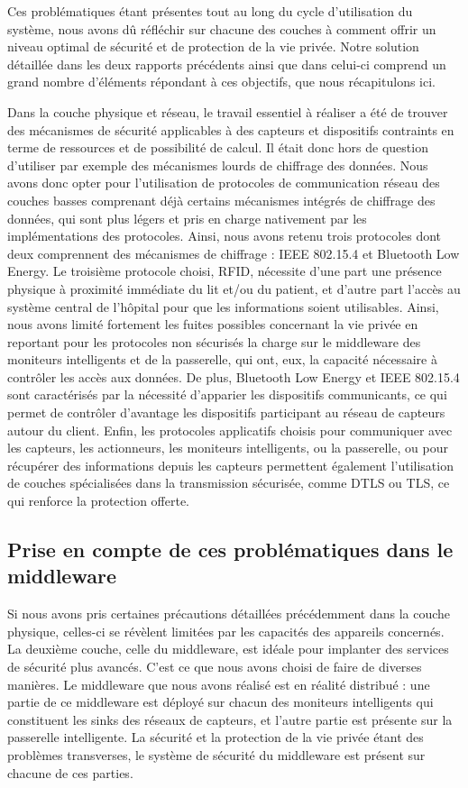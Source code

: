 Ces problématiques étant présentes tout au long du cycle d’utilisation du système, nous avons dû réfléchir sur chacune des couches à comment offrir un niveau optimal de sécurité et de protection de la vie privée. Notre solution détaillée dans les deux rapports précédents ainsi que dans celui-ci comprend un grand nombre d’éléments répondant à ces objectifs, que nous récapitulons ici.

Dans la couche physique et réseau, le travail essentiel à réaliser a été de trouver des mécanismes de sécurité applicables à des capteurs et dispositifs contraints en terme de ressources et de possibilité de calcul. Il était donc hors de question d’utiliser par exemple des mécanismes lourds de chiffrage des données. Nous avons donc opter pour l’utilisation de protocoles de communication réseau des couches basses comprenant déjà certains mécanismes intégrés de chiffrage des données, qui sont plus légers et pris en charge nativement par les implémentations des protocoles. Ainsi, nous avons retenu trois protocoles dont deux comprennent des mécanismes de chiffrage : IEEE 802.15.4 et Bluetooth Low Energy. Le troisième protocole choisi, RFID, nécessite d’une part une présence physique à proximité immédiate du lit et/ou du patient, et d’autre part l’accès au système central de l’hôpital pour que les informations soient utilisables. Ainsi, nous avons limité fortement les fuites possibles concernant la vie privée en reportant pour les protocoles non sécurisés la charge sur le middleware des moniteurs intelligents et de la passerelle, qui ont, eux, la capacité nécessaire à contrôler les accès aux données. De plus, Bluetooth Low Energy et IEEE 802.15.4 sont caractérisés par la nécessité d’apparier les dispositifs communicants, ce qui permet de contrôler d’avantage les dispositifs participant au réseau de capteurs autour du client. Enfin, les protocoles applicatifs choisis pour communiquer avec les capteurs, les actionneurs, les moniteurs intelligents, ou la passerelle, ou pour récupérer des informations depuis les capteurs permettent également l’utilisation de couches spécialisées dans la transmission sécurisée, comme DTLS ou TLS, ce qui renforce la protection offerte.
 
\subsection{Prise en compte de ces problématiques dans le middleware}

Si nous avons pris certaines précautions détaillées précédemment dans la couche physique, celles-ci se révèlent limitées par les capacités des appareils concernés. La deuxième couche, celle du middleware, est idéale pour implanter des services de sécurité plus avancés. C’est ce que nous avons choisi de faire de diverses manières. Le middleware que nous avons réalisé est en réalité distribué : une partie de ce middleware est déployé sur chacun des moniteurs intelligents qui constituent les sinks des réseaux de capteurs, et l’autre partie est présente sur la passerelle intelligente. La sécurité et la protection de la vie privée étant des problèmes transverses, le système de sécurité du middleware est présent sur chacune de ces parties.

